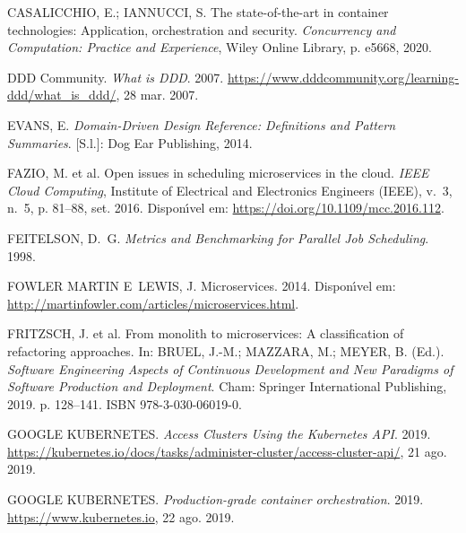 \documentclass[
	12pt,				%
	openright,			%
	oneside,			%
	a4paper,			%
	brazil				%
	]{abntex2}
\begin{document}
\begin{thebibliography}{}
{CASALICCHIO, E.; IANNUCCI, S. The state-of-the-art in container technologies:
  Application, orchestration and security.
\emph{Concurrency and Computation: Practice and Experience}, Wiley Online
  Library, p. e5668, 2020.}

{{DDD Community}. \emph{What is DDD}. 2007.
\url{https://www.dddcommunity.org/learning-ddd/what_is_ddd/}, 28 mar. 2007.}

{EVANS, E. \emph{Domain-Driven Design Reference: Definitions and Pattern
  Summaries}. [S.l.]: Dog Ear Publishing, 2014.}

{FAZIO, M. et al. Open issues in scheduling microservices in the cloud.
\emph{{IEEE} Cloud Computing}, Institute of Electrical and Electronics
  Engineers ({IEEE}), v.~3, n.~5, p. 81--88, set. 2016.
Dispon{\'\i}vel em: \url{https://doi.org/10.1109/mcc.2016.112}.}

{FEITELSON, D.~G. \emph{Metrics and Benchmarking for Parallel Job Scheduling}.
  1998.}

{FOWLER MARTIN E~LEWIS, J. Microservices.
2014.
Dispon{\'\i}vel em: \url{http://martinfowler.com/articles/microservices.html}.}

{FRITZSCH, J. et al. From monolith to microservices: A classification of
  refactoring approaches. In:  BRUEL, J.-M.; MAZZARA, M.; MEYER, B. (Ed.).
  \emph{Software Engineering Aspects of Continuous Development and New
  Paradigms of Software Production and Deployment}. Cham: Springer
  International Publishing, 2019. p. 128--141.
ISBN 978-3-030-06019-0.}

{{GOOGLE KUBERNETES}. \emph{Access Clusters Using the Kubernetes API}. 2019.
\url{https://kubernetes.io/docs/tasks/administer-cluster/access-cluster-api/},
  21 ago. 2019.}

{{GOOGLE KUBERNETES}. \emph{Production-grade container orchestration}. 2019.
\url{https://www.kubernetes.io}, 22 ago. 2019.}


\end{thebibliography}
\end{document}
